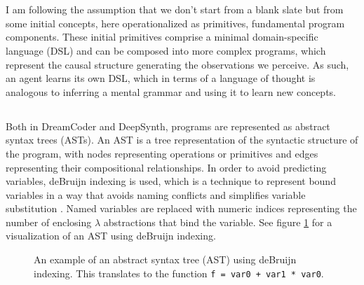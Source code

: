 \section{}

I am following the assumption that we don't start from a blank slate but from some initial concepts, here operationalized as primitives, fundamental program components. These initial primitives comprise a minimal domain-specific language (DSL) and can be composed into more complex programs, which represent the causal structure generating the observations we perceive. As such, an agent learns its own DSL, which in terms of a language of thought is analogous to inferring a mental grammar and using it to learn new concepts.



\subsection{}



\subsubsection{}

Both in DreamCoder and DeepSynth, programs are represented as abstract syntax trees (ASTs). An AST is a tree representation of the syntactic structure of the program, with nodes representing operations or primitives and edges representing their compositional relationships. In order to avoid predicting variables, deBruijn indexing is used, which is a technique to represent bound variables in a way that avoids naming conflicts and simplifies variable substitution \cite{de_Bruijn_1972}. Named variables are replaced with numeric indices representing the number of enclosing $\lambda$ abstractions that bind the variable. See figure \ref{fig:AST} for a visualization of an AST using deBruijn indexing.

\begin{figure}[H]
    \centering
    \caption{An example of an abstract syntax tree (AST) using deBruijn indexing. This translates to the function \texttt{f = var0 + var1 * var0}.}
    \label{fig:AST}
\end{figure}




